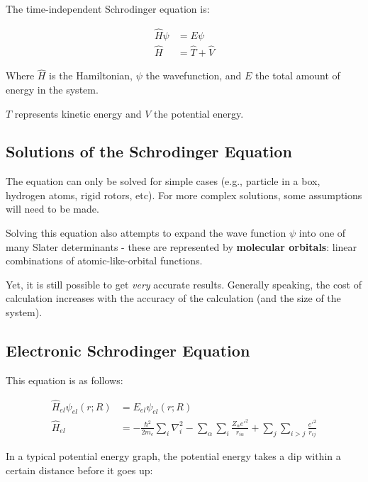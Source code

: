\documentclass[
  letterpaper,
  DIV=11,
  numbers=noendperiod]{scrreprt}
\begin{document}
The time-independent Schrodinger equation is:

\begin{align}
  \hat{H}\psi &= E\psi \\ 
  \hat{H} &= \hat{T} + \hat{V}
\end{align}

Where \(\hat{H}\) is the Hamiltonian, \(\psi\) the wavefunction, and
\(E\) the total amount of energy in the system.

\(T\) represents kinetic energy and \(V\) the potential energy.

\hypertarget{solutions-of-the-schrodinger-equation}{%
\subsection{Solutions of the Schrodinger
Equation}\label{solutions-of-the-schrodinger-equation}}

The equation can only be solved for simple cases (e.g., particle in a
box, hydrogen atoms, rigid rotors, etc). For more complex solutions,
some assumptions will need to be made.

Solving this equation also attempts to expand the wave function \(\psi\)
into one of many Slater determinants - these are represented by
\textbf{molecular orbitals}: linear combinations of atomic-like-orbital
functions.

Yet, it is still possible to get \emph{very} accurate results. Generally
speaking, the cost of calculation increases with the accuracy of the
calculation (and the size of the system).

\hypertarget{electronic-schrodinger-equation}{%
\subsection{Electronic Schrodinger
Equation}\label{electronic-schrodinger-equation}}

This equation is as follows:

\begin{align}
  \hat{H}_{el}\psi_{el}(r; R) &=  E_{el}\psi_{el}(r; R) \\ 
  \hat{H}_{el} &= -\frac{\hbar^2}{2m_e}\sum_i\nabla_i^2 - \sum_\alpha\sum_i\frac{Z_\alpha e'^2}{r_{i\alpha}} + \sum_j\sum_{i > j}\frac{e'^2}{r_{ij}}
\end{align}

In a typical potential energy graph, the potential energy takes a dip
within a certain distance before it goes up:
\end{document}
